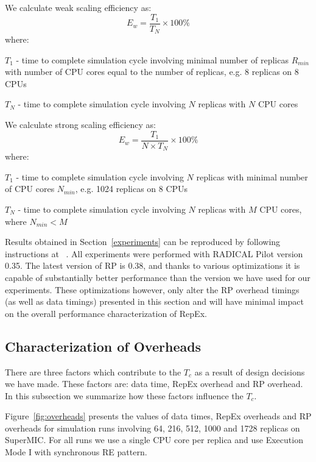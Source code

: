 \documentclass{sig-alternate-05-2015}
\begin{document}
We calculate weak scaling efficiency as:
\begin{equation}
E_{w} = \frac{T_{1}}{T_N} \times 100 \% 
\end{equation}
where:
\begin{compactitem}
  \item $T_{1}$ - time to complete simulation cycle involving minimal number of replicas $R_{min}$ with number of CPU cores equal to the number of replicas, e.g. 8 replicas on 8 CPUs
  \item $T_{N}$ - time to complete simulation cycle involving $N$ replicas with $N$ CPU cores
\end{compactitem}
We calculate strong scaling efficiency as:
\begin{equation}
E_{w} = \frac{T_{1}}{N \times T_N} \times 100 \% 
\end{equation}
where:
\begin{compactitem}
  \item $T_{1}$ - time to complete simulation cycle involving $N$ replicas with minimal number of CPU cores $N_{min}$, e.g. 1024 replicas on 8 CPUs
  \item $T_{N}$ - time to complete simulation cycle involving $N$ replicas with $M$ CPU cores, where $N_{min} < M$
\end{compactitem}

Results obtained in Section~\ref{experiments} can be reproduced by following instructions at ~\cite{repex-experiments}. All experiments were performed with RADICAL Pilot version 0.35. The latest version of RP is 0.38, and thanks to various optimizations it is capable of substantially better performance than the version we have used for our experiments. These optimizations however, only alter the RP overhead timings (as well as data timings) presented in this section and will have minimal impact on the overall performance characterization of RepEx.

\subsection{Characterization of Overheads} \label{over}

There are three factors which contribute to the $T_{c}$ as a result of design decisions we have made. These factors are: data time, RepEx overhead and RP overhead. In this subsection we summarize how these factors influence the $T_{c}$.

Figure~\ref{fig:overheads} presents the values of data times, RepEx overheads and RP overheads for simulation runs involving 64, 216, 512, 1000 and 1728 replicas on SuperMIC. For all runs we use a single CPU core per replica and use Execution Mode I with synchronous RE pattern.
\end{document}
